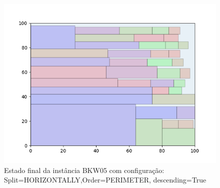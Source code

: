 \begin{figure}[H]
    \centering
    \caption[]{Estado final da instância BKW05 com configuração: Split=HORIZONTALLY,Order=PERIMETER, descending=True}
    \label{fig:bkw05-horizontally-perimeter-true}
    \includegraphics[scale=0.5]{output/figures/bkw/bkw05/horizontally/perimeter/true/00}
\end{figure}